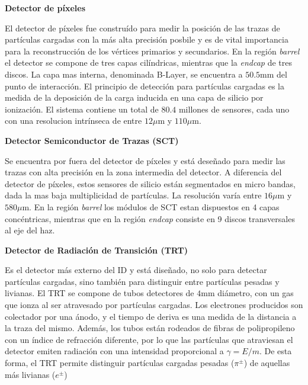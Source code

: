 \vspace{0.5cm}

{\bf Detector de píxeles }

El detector de píxeles fue construído para medir la posición de las trazas de partículas cargadas con la más alta precisión posbile y es de vital importancia para la reconstrucción de los vértices primarios y secundarios. En la región \textit{barrel} el detector se compone de tres capas cilíndricas, mientras que la \textit{endcap} de tres discos. La capa mas interna, denominada B-Layer, se encuentra a $50.5$mm del punto de interacción. El principio de detección para partículas cargadas es la medida de la deposición de la carga inducida en una capa de silicio por ionización. El sistema contiene un total de $80.4$ millones de sensores, cada uno con una resolucion intrínseca de entre $12\mu$m y $110\mu$m.

\vspace{0.5cm}

{\bf Detector Semiconductor de Trazas (SCT) }

Se encuentra por fuera del detector de píxeles y está deseñado para medir las trazas con alta precisión en la zona intermedia del detector. A diferencia del detector de píxeles, estos sensores de silicio están segmentados en micro bandas, dada la mas baja multiplicidad de partículas. La resolución varía entre $16\mu$m y $580\mu$m. En la región \textit{barrel} los módulos de SCT estan dispuestos en 4 capas concéntricas, mientras que en la región \textit{endcap} consiste en 9 discos transversales al eje del haz.

\vspace{0.5cm}

{\bf Detector de Radiación de Transición (TRT) }

Es el detector más externo del ID y está diseñado, no solo para detectar partículas cargadas, sino también para distinguir entre partículas pesadas y livianas. El TRT se compone de tubos detectores de $4$mm diámetro, con un gas que ionza al ser atravesado por partículas cargadas. Los electrones producidos son colectador por una ánodo, y el tiempo de deriva es una medida de la distancia a la traza del mismo.  Además, los tubos están rodeados de fibras de polipropileno con un índice de refracción diferente, por lo que las partículas que atraviesan el detector emiten radiación con una intensidad proporcional a $\gamma=E/m$. De esta forma, el TRT permite distinguir partículas cargadas pesadas ($\pi^{\pm}$) de aquellas más livianas ($e^{\pm}$)

